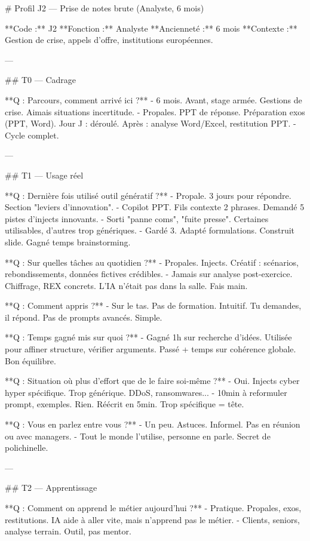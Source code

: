 # Profil J2 — Prise de notes brute (Analyste, 6 mois)

**Code :** J2  
**Fonction :** Analyste  
**Ancienneté :** 6 mois  
**Contexte :** Gestion de crise, appels d'offre, institutions européennes.

---

## T0 — Cadrage

**Q : Parcours, comment arrivé ici ?**
- 6 mois. Avant, stage armée. Gestions de crise. Aimais situations incertitude.
- Propales. PPT de réponse. Préparation exos (PPT, Word). Jour J : déroulé. Après : analyse Word/Excel, restitution PPT.
- Cycle complet.

---

## T1 — Usage réel

**Q : Dernière fois utilisé outil génératif ?**
- Propale. 3 jours pour répondre. Section "leviers d'innovation".
- Copilot PPT. Fils contexte 2 phrases. Demandé 5 pistes d'injects innovants.
- Sorti "panne coms", "fuite presse". Certaines utilisables, d'autres trop génériques.
- Gardé 3. Adapté formulations. Construit slide. Gagné temps brainstorming.

**Q : Sur quelles tâches au quotidien ?**
- Propales. Injects. Créatif : scénarios, rebondissements, données fictives crédibles.
- Jamais sur analyse post-exercice. Chiffrage, REX concrets. L'IA n'était pas dans la salle. Fais main.

**Q : Comment appris ?**
- Sur le tas. Pas de formation. Intuitif. Tu demandes, il répond. Pas de prompts avancés. Simple.

**Q : Temps gagné mis sur quoi ?**
- Gagné 1h sur recherche d'idées. Utilisée pour affiner structure, vérifier arguments. Passé + temps sur cohérence globale. Bon équilibre.

**Q : Situation où plus d'effort que de le faire soi-même ?**
- Oui. Injects cyber hyper spécifique. Trop générique. DDoS, ransomwares...
- 10min à reformuler prompt, exemples. Rien. Réécrit en 5min. Trop spécifique = tête.

**Q : Vous en parlez entre vous ?**
- Un peu. Astuces. Informel. Pas en réunion ou avec managers.
- Tout le monde l'utilise, personne en parle. Secret de polichinelle.

---

## T2 — Apprentissage

**Q : Comment on apprend le métier aujourd'hui ?**
- Pratique. Propales, exos, restitutions. IA aide à aller vite, mais n'apprend pas le métier.
- Clients, seniors, analyse terrain. Outil, pas mentor.

